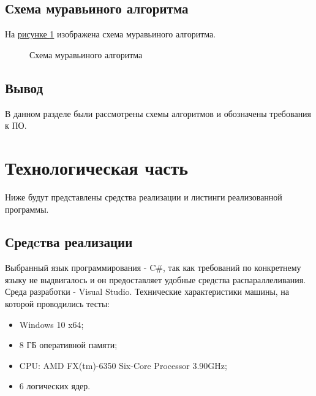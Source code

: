 \documentclass{article}
\begin{document}
	\subsection{Схема муравьиного алгоритма}
		На \hyperref[antAlgo]{рисунке  \ref{antAlgo}} изображена схема муравьиного алгоритма.
	\begin{figure}[H]
		\caption{Схема муравьиного алгоритма}
		\label{antAlgo}
	\end{figure}

	\subsection{Вывод}
	В данном разделе были рассмотрены схемы алгоритмов и обозначены требования к ПО.
	
	\newpage
	\section{Технологическая часть}
	Ниже будут представлены средства реализации и листинги реализованной программы.
	\subsection{Средcтва реализации}
	Выбранный язык программирования - C\#, так как требований по конкретнему языку не выдвигалось и он предоставляет удобные средства распараллеливания.\cite{c-parallel} Среда разработки - Visual Studio.\cite{vs}
\newline
	\indent Технические характеристики машины, на которой проводились тесты:
	\begin{itemize}
	\item Windows 10 x64;
	\item 8 ГБ оперативной памяти;
	\item CPU: AMD FX(tm)-6350 Six-Core Processor 3.90GHz;
	\item 6 логических ядер.
	\end{itemize}	
\end{document}
